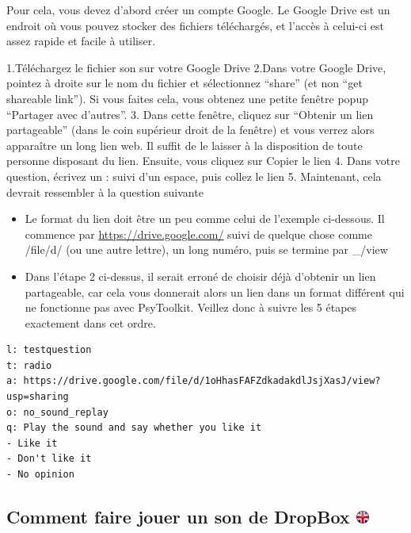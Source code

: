 \documentclass[
]{book}
\providecommand{\tightlist}{%
  \setlength{\itemsep}{0pt}\setlength{\parskip}{0pt}}
\begin{document}
Pour cela, vous devez d'abord créer un compte Google. Le Google Drive
est un endroit où vous pouvez stocker des fichiers téléchargés, et
l'accès à celui-ci est assez rapide et facile à utiliser.

1.Téléchargez le fichier son sur votre Google Drive 2.Dans votre Google
Drive, pointez à droite sur le nom du fichier et sélectionnez ``share''
(et non ``get shareable link''). Si vous faites cela, vous obtenez une
petite fenêtre popup ``Partager avec d'autres''. 3. Dans cette fenêtre,
cliquez sur ``Obtenir un lien partageable'' (dans le coin supérieur
droit de la fenêtre) et vous verrez alors apparaître un long lien web.
Il suffit de le laisser à la disposition de toute personne disposant du
lien. Ensuite, vous cliquez sur Copier le lien 4. Dans votre question,
écrivez un : suivi d'un espace, puis collez le lien 5. Maintenant, cela
devrait ressembler à la question suivante

\begin{itemize}
\tightlist
\item
  Le format du lien doit être un peu comme celui de l'exemple
  ci-dessous. Il commence par \url{https://drive.google.com/} suivi de
  quelque chose comme /file/d/ (ou une autre lettre), un long numéro,
  puis se termine par \_/view
\item
  Dans l'étape 2 ci-dessus, il serait erroné de choisir déjà d'obtenir
  un lien partageable, car cela vous donnerait alors un lien dans un
  format différent qui ne fonctionne pas avec PsyToolkit. Veillez donc à
  suivre les 5 étapes exactement dans cet ordre.
\end{itemize}

\begin{verbatim}
l: testquestion
t: radio
a: https://drive.google.com/file/d/1oHhasFAFZdkadakdlJsjXasJ/view?usp=sharing
o: no_sound_replay
q: Play the sound and say whether you like it
- Like it
- Don't like it
- No opinion
\end{verbatim}

\hypertarget{comment-faire-jouer-un-son-de-dropbox}{%
\subsection[Comment faire jouer un son de DropBox
]{\texorpdfstring{Comment faire jouer un son de DropBox
\href{https://www.psytoolkit.org/lessons/surveyaudiovideo.html\#_how_to_play_a_sound_from_dropbox}{\protect\includegraphics{img/ukflag.png}}}{Comment faire jouer un son de DropBox }}\label{comment-faire-jouer-un-son-de-dropbox}}
\end{document}
